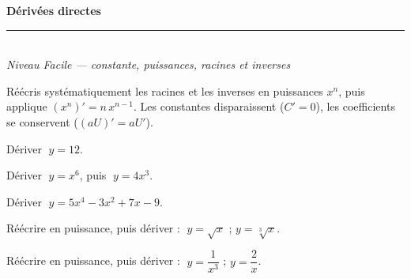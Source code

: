 \pagestyle{fancy}\fancyhf{}
\fancyfoot[C]{\small\thepage}
\renewcommand{\headrulewidth}{0.8pt}



\begin{center}
{\LARGE\bfseries\color{primarydark} Dérivées directes}\\[2pt]
{\color{primary}\rule{0.5\textwidth}{1.2pt}}\\[4pt]
{\small\itshape Niveau Facile --- constante, puissances, racines et inverses}
\end{center}
\vspace{2mm}

\begin{methode}
Réécris systématiquement les racines et les inverses en puissances $x^{n}$, puis applique $(x^{n})'=n\,x^{n-1}$. Les constantes disparaissent ($C'=0$), les coefficients se conservent ($(aU)'=aU'$).
\end{methode}

\begin{exo}
Dériver $\;y=12$.
\end{exo}

\begin{exo}
Dériver $\;y=x^{6}$, puis $\;y=4x^{3}$.
\end{exo}

\begin{exo}
Dériver $\;y=5x^{4}-3x^{2}+7x-9$.
\end{exo}

\begin{exo}
Réécrire en puissance, puis dériver : $\;y=\sqrt{x}$ ; \quad $y=\sqrt[3]{x}$.
\end{exo}

\begin{exo}
Réécrire en puissance, puis dériver : $\;y=\dfrac{1}{x^{3}}$ ; \quad $y=\dfrac{2}{x}$.
\end{exo}


